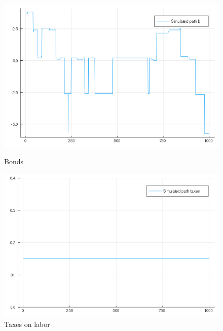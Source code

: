 \documentclass[12pt]{article}
\begin{document}
\begin{figure}[h]
    \centering
    \begin{minipage}{0.45\textwidth}
        \centering
        \includegraphics[width=1.2\textwidth]{ramsey_B.png} %
        \caption{Bonds}
    \end{minipage}\hfill
    \begin{minipage}{0.45\textwidth}
        \centering
        \includegraphics[width=1.2\textwidth]{ramsey_Tau.png} %
        \caption{Taxes on labor}
    \end{minipage}
\end{figure}
\end{document}
